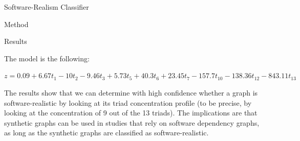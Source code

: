 \documentclass[11pt,twocolumn,a4paper,english]{article}
\begin{document}
\begin{section}{Software-Realism Classifier}
\begin{subsection}{Method}
\begin{subsubsection}{Results}
	
	The model is the following:
% 
% 	


\begin{framed}
$z = 0.09 + 6.67t_1 - 10t_2 - 9.46t_3 + 5.73t_5 + 40.3t_6 + 23.45t_7 -157.7t_{10} -138.36t_{12} - 843.11t_{13}$
\end{framed}
	
	The results show that we can determine with high confidence whether a graph is software-realistic by looking at its triad concentration profile (to be precise, by looking at the concentration of 9 out of the 13 triads). The implications are that synthetic graphs can be used in studies that rely on software dependency graphs, as long as the synthetic graphs are classified as software-realistic.


\end{subsubsection}

\end{subsection}
	
\end{section}

\end{document}
